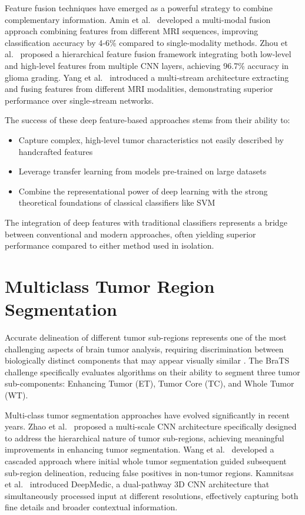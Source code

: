 Feature fusion techniques have emerged as a powerful strategy to combine complementary information. Amin et al.\ \cite{Amin2020} developed a multi-modal fusion approach combining features from different MRI sequences, improving classification accuracy by 4-6\% compared to single-modality methods. Zhou et al.\ \cite{Zhou2020} proposed a hierarchical feature fusion framework integrating both low-level and high-level features from multiple CNN layers, achieving 96.7\% accuracy in glioma grading. Yang et al.\ \cite{Yang2018} introduced a multi-stream architecture extracting and fusing features from different MRI modalities, demonstrating superior performance over single-stream networks.

The success of these deep feature-based approaches stems from their ability to:
\begin{itemize}
  \item Capture complex, high-level tumor characteristics not easily described by handcrafted features \cite{Afshar2019}
  \item Leverage transfer learning from models pre-trained on large datasets \cite{Sajjad2019}
  \item Combine the representational power of deep learning with the strong theoretical foundations of classical classifiers like SVM \cite{Talo2019}
\end{itemize}

The integration of deep features with traditional classifiers represents a bridge between conventional and modern approaches, often yielding superior performance compared to either method used in isolation.

\section{Multiclass Tumor Region Segmentation}

Accurate delineation of different tumor sub-regions represents one of the most challenging aspects of brain tumor analysis, requiring discrimination between biologically distinct components that may appear visually similar \cite{Bakas2018}. The BraTS challenge specifically evaluates algorithms on their ability to segment three tumor sub-components: Enhancing Tumor (ET), Tumor Core (TC), and Whole Tumor (WT).

Multi-class tumor segmentation approaches have evolved significantly in recent years. Zhao et al.\ \cite{Zhao2018} proposed a multi-scale CNN architecture specifically designed to address the hierarchical nature of tumor sub-regions, achieving meaningful improvements in enhancing tumor segmentation. Wang et al.\ \cite{Wang2017} developed a cascaded approach where initial whole tumor segmentation guided subsequent sub-region delineation, reducing false positives in non-tumor regions. Kamnitsas et al.\ \cite{Kamnitsas2017} introduced DeepMedic, a dual-pathway 3D CNN architecture that simultaneously processed input at different resolutions, effectively capturing both fine details and broader contextual information.


